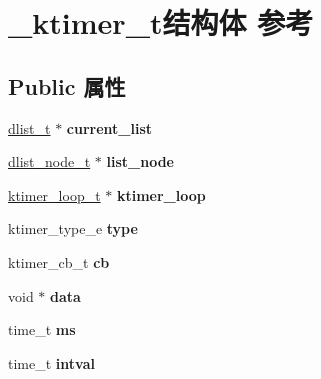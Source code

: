 \hypertarget{struct__ktimer__t}{}\section{\+\_\+ktimer\+\_\+t结构体 参考}
\label{struct__ktimer__t}
\subsection*{Public 属性}
\begin{DoxyCompactItemize}
\item 
\hypertarget{struct__ktimer__t_af3efe4998796ae77714c2bd293891506}{}\hyperlink{struct__dlist__t}{dlist\+\_\+t} $\ast$ {\bfseries current\+\_\+list}\label{struct__ktimer__t_af3efe4998796ae77714c2bd293891506}

\item 
\hypertarget{struct__ktimer__t_a5514bb4918b14de260b0a9e60d2b040a}{}\hyperlink{struct__dlist__node__t}{dlist\+\_\+node\+\_\+t} $\ast$ {\bfseries list\+\_\+node}\label{struct__ktimer__t_a5514bb4918b14de260b0a9e60d2b040a}

\item 
\hypertarget{struct__ktimer__t_aa990d5bd4a8b8079988b9db4c1cc11f5}{}\hyperlink{struct__ktimer__loop__t}{ktimer\+\_\+loop\+\_\+t} $\ast$ {\bfseries ktimer\+\_\+loop}\label{struct__ktimer__t_aa990d5bd4a8b8079988b9db4c1cc11f5}

\item 
\hypertarget{struct__ktimer__t_a7423b634636770ecb2f6edfbc6bdc73d}{}ktimer\+\_\+type\+\_\+e {\bfseries type}\label{struct__ktimer__t_a7423b634636770ecb2f6edfbc6bdc73d}

\item 
\hypertarget{struct__ktimer__t_ab819f6a6f6ada412a7f48eacf2bbe329}{}ktimer\+\_\+cb\+\_\+t {\bfseries cb}\label{struct__ktimer__t_ab819f6a6f6ada412a7f48eacf2bbe329}

\item 
\hypertarget{struct__ktimer__t_a06e03c86d2720dac84bef631e6a8e47a}{}void $\ast$ {\bfseries data}\label{struct__ktimer__t_a06e03c86d2720dac84bef631e6a8e47a}

\item 
\hypertarget{struct__ktimer__t_a1a12892ba226e41cc852fd118b7fd08b}{}time\+\_\+t {\bfseries ms}\label{struct__ktimer__t_a1a12892ba226e41cc852fd118b7fd08b}

\item 
\hypertarget{struct__ktimer__t_a36cb3a8cf9533869881fbcecc06554f9}{}time\+\_\+t {\bfseries intval}\label{struct__ktimer__t_a36cb3a8cf9533869881fbcecc06554f9}


\end{DoxyCompactItemize}
